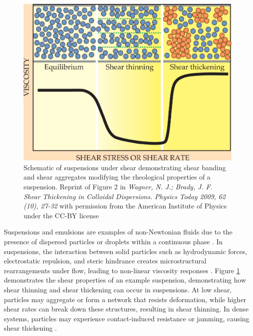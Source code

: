 \begin{figure}
    \centering
    \includegraphics[scale = 0.3]{../figures/literature_review/shear_suspensions.jpeg}
    \caption{Schematic of suspensions under shear demonstrating shear banding and shear aggregates modifying the rheological properties of a suspension. 
             Reprint of Figure 2 in \textit{Wagner, N. J.; Brady, J. F. Shear Thickening in Colloidal Dispersions. Physics Today 2009, 62 (10), 27-32}
             with permission from the American Institute of Physics under the CC-BY license}
    \label{fig:suspension_shear}
\end{figure}

Suspensions and emulsions are examples of non-Newtonian fluids due to the presence of dispersed particles or droplets within a continuous phase
\cite{brader_nonlinear_2010, besseling_three-dimensional_2007, xu_relation_2013}.
In suspensions, the interaction  between solid particles such as hydrodynamic forces, electrostatic repulsion, and steric hindrance creates microstructural rearrangements under flow, leading to 
non-linear viscosity responses \cite{brader_nonlinear_2010, besseling_three-dimensional_2007}. Figure \ref{fig:suspension_shear} demonstrates the shear properties of an example suspension, 
demonstrating how shear thinning and shear thickening can occur in suspensions. At low shear, particles may aggregate or form a network that resists deformation, while higher shear rates can break 
down these structures, resulting in shear thinning. In dense systems, particles may experience contact-induced resistance or jamming, causing shear thickening \cite{brader_nonlinear_2010}. 

